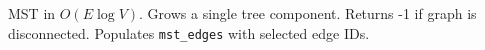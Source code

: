 
MST in $O(E \log V)$. Grows a single tree component. Returns -1 if graph is disconnected. Populates \lstinline|mst_edges| with selected edge IDs.


